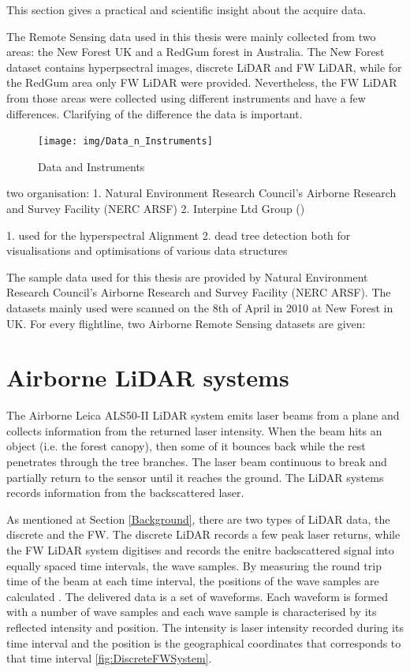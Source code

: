 \documentclass{subfiles}
\begin{document}
This section gives a practical and scientific insight about the acquire data. 



The Remote Sensing data used in this thesis were mainly collected from two areas: the New Forest UK and a RedGum forest in Australia. The New Forest dataset contains hyperpsectral images, discrete LiDAR and FW LiDAR, while for the RedGum area only FW LiDAR were provided. Nevertheless, the FW LiDAR from those areas were collected using different instruments and have a few differences. Clarifying of the difference the data is important.

    \begin{figure}[!htbp]
    	\centering
    	\texttt{[image: img/Data\_n\_Instruments]}
    	\caption{Data and Instruments}
    	\label{fig:dataInstrumentsRelations}
    \end{figure}

    two organisation:
	1. Natural Environment Research Council’s Airborne Research and Survey Facility (NERC ARSF)
	2. Interpine Ltd Group () 
	
	1. used for the hyperspectral Alignment
	2. dead tree detection
	both for visualisations and optimisations of various data structures
	
	The sample data used for this thesis are provided by Natural Environment Research Council’s Airborne Research and Survey Facility (NERC ARSF). The datasets mainly used were scanned on the 8th of April in 2010 at New Forest in UK. For every flightline, two Airborne Remote Sensing datasets are given: 
	

	




    \section{Airborne LiDAR systems}
    
    The Airborne Leica ALS50-II LiDAR system emits laser beams from a plane and collects information from the  returned laser intensity. When the beam hits an object (i.e. the forest canopy), then some of it bounces back while the rest penetrates through the tree branches. The laser beam continuous to break and partially return to the sensor until it reaches the ground. The LiDAR systems records information from the backscattered laser. 

    
     As mentioned at Section \ref{Background}, there are two types of LiDAR data, the discrete and the FW. The discrete LiDAR records a few peak laser returns, while the FW LiDAR system digitises and records the enitre backscattered signal into equally spaced time intervals, the wave samples. By measuring the round trip time of the beam at each time interval, the positions of the wave samples are calculated \cite{Wanger2004}. The delivered data is a set of waveforms. Each waveform is formed with a number of wave samples and each wave sample is characterised by its reflected intensity and position. The intensity is laser intensity recorded during its time interval and the position is the geographical coordinates that corresponds to that time interval \ref{fig:DiscreteFWSystem}.
    
\end{document}
